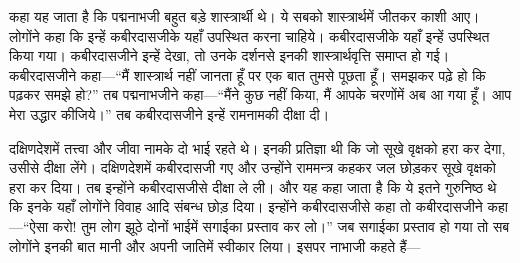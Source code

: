 \begin{sloppypar}\justifying{}
कहा यह जाता है कि पद्मनाभजी बहुत बड़े शास्त्रार्थी थे। ये सबको शास्त्रार्थमें जीतकर काशी आए। लोगोंने कहा कि इन्हें कबीरदासजीके यहाँ उपस्थित करना चाहिये। कबीरदासजीके यहाँ इन्हें उपस्थित किया गया। कबीरदासजीने इन्हें देखा, तो उनके दर्शनसे इनकी शास्त्रार्थवृत्ति समाप्त हो गई। कबीरदासजीने कहा—“मैं शास्त्रार्थ नहीं जानता हूँ पर एक बात तुमसे पूछता हूँ। समझकर पढ़े हो कि पढ़कर समझे हो?” तब पद्मनाभजीने कहा—“मैंने कुछ नहीं किया, मैं आपके चरणोंमें अब आ गया हूँ। आप मेरा उद्धार कीजिये।” तब कबीरदासजीने इन्हें रामनामकी दीक्षा दी।
\end{sloppypar}
\begin{sloppypar}\justifying{}
दक्षिणदेशमें तत्त्वा और जीवा नामके दो भाई रहते थे। इनकी प्रतिज्ञा थी कि जो सूखे वृक्षको हरा कर देगा, उसीसे दीक्षा लेंगे। दक्षिणदेशमें कबीरदासजी गए और उन्होंने राममन्त्र कहकर जल छोड़कर सूखे वृक्षको हरा कर दिया। तब इन्होंने कबीरदासजीसे दीक्षा ले ली। और यह कहा जाता है कि ये इतने गुरुनिष्ठ थे कि इनके यहाँ लोगोंने विवाह आदि संबन्ध छोड़ दिया। इन्होंने कबीरदासजीसे कहा तो कबीरदासजीने कहा—“ऐसा करो! तुम लोग झूठे दोनों भाईमें सगाईका प्रस्ताव कर लो।” जब सगाईका प्रस्ताव हो गया तो सब लोगोंने इनकी बात मानी और अपनी जातिमें स्वीकार लिया। इसपर नाभाजी कहते हैं—
\end{sloppypar}



